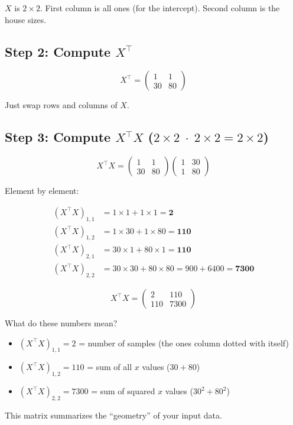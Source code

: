\documentclass[11pt, a4paper]{article}
\newcommand{\gut}[1]{\begin{tcolorbox}[colback=lightyellow, colframe=orange!50, title=Gut feeling]#1\end{tcolorbox}}
\begin{document}
$X$ is $2 \times 2$. First column is all ones (for the intercept). Second column is the house sizes.


\subsection*{Step 2: Compute $X^\top$}

\begin{equation}
X^\top = \begin{pmatrix} 1 & 1 \\ 30 & 80 \end{pmatrix}
\tag{N-2}
\end{equation}

Just swap rows and columns of $X$.


\subsection*{Step 3: Compute $X^\top X$ \quad ($2\times 2 \;\cdot\; 2\times 2 = 2\times 2$)}

\begin{equation}
X^\top X = \begin{pmatrix} 1 & 1 \\ 30 & 80 \end{pmatrix}
\begin{pmatrix} 1 & 30 \\ 1 & 80 \end{pmatrix}
\tag{N-3}
\end{equation}

Element by element:

\begin{align}
(X^\top X)_{1,1} &= 1 \times 1 + 1 \times 1 = \mathbf{2} \tag{N-3a} \\
(X^\top X)_{1,2} &= 1 \times 30 + 1 \times 80 = \mathbf{110} \tag{N-3b} \\
(X^\top X)_{2,1} &= 30 \times 1 + 80 \times 1 = \mathbf{110} \tag{N-3c} \\
(X^\top X)_{2,2} &= 30 \times 30 + 80 \times 80 = 900 + 6400 = \mathbf{7300} \tag{N-3d}
\end{align}

\begin{equation}
X^\top X = \begin{pmatrix} 2 & 110 \\ 110 & 7300 \end{pmatrix}
\tag{N-4}
\end{equation}

\gut{
What do these numbers mean?
\begin{itemize}
\item $(X^\top X)_{1,1} = 2$ = number of samples (the ones column dotted with itself)
\item $(X^\top X)_{1,2} = 110$ = sum of all $x$ values ($30 + 80$)
\item $(X^\top X)_{2,2} = 7300$ = sum of squared $x$ values ($30^2 + 80^2$)
\end{itemize}
This matrix summarizes the ``geometry'' of your input data.
}
\end{document}
